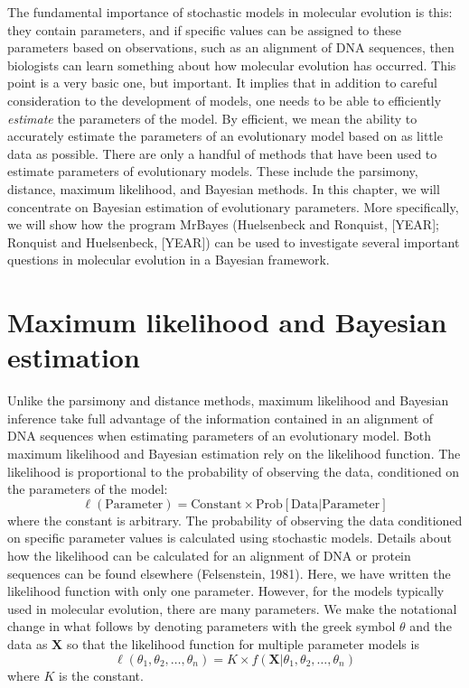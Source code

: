 \documentclass{svmult}
\begin{document}
The fundamental importance of stochastic models in molecular evolution is this: they contain
parameters, and if specific values can be assigned to these parameters based on observations, such
as an alignment of DNA sequences, then biologists can learn something about how molecular evolution
has occurred. This point is a very basic one, but important. It implies that in addition to careful
consideration to the development of models, one needs to be able to efficiently {\it estimate} the
parameters of the model. By efficient, we mean the ability to accurately estimate the parameters of
an evolutionary model based on as little data as possible. There are only a handful of methods that
have been used to estimate parameters of evolutionary models. These include the parsimony,
distance, maximum likelihood, and Bayesian methods. In this chapter, we will concentrate on
Bayesian estimation of evolutionary parameters. More specifically, we will show how the program
MrBayes (Huelsenbeck and Ronquist, [YEAR]; Ronquist and Huelsenbeck, [YEAR]) can be used to
investigate several important questions in molecular evolution in a Bayesian framework.


\section{Maximum likelihood and Bayesian estimation}
\label{sec:2}

Unlike the parsimony and distance methods, maximum likelihood and Bayesian inference take full
advantage of the information contained in an alignment of DNA sequences when estimating parameters
of an evolutionary model. Both maximum likelihood and Bayesian estimation rely on the likelihood
function. The likelihood is proportional to the probability of observing the data, conditioned on
the parameters of the model:
$$
\ell(\mbox{Parameter}) = \mbox{Constant} \times \mbox{Prob}[\mbox{Data} | \mbox{Parameter}]
$$
where the constant is arbitrary. The probability of observing the data conditioned on specific
parameter values is calculated using stochastic models. Details about how the likelihood can be
calculated for an alignment of DNA or protein sequences can be found elsewhere (Felsenstein, 1981).
Here, we have written the likelihood function with only one parameter. However, for the models
typically used in molecular evolution, there are many parameters.  We make the notational change in
what follows by denoting parameters with the greek symbol $\theta$ and the data as $\mathbf{X}$ so
that the likelihood function for multiple parameter models is
$$
\ell(\theta_1, \theta_2, \ldots, \theta_n) = K \times f(\mathbf{X} | \theta_1, \theta_2, \ldots,
\theta_n)
$$ 
where $K$ is the constant.
\end{document}

